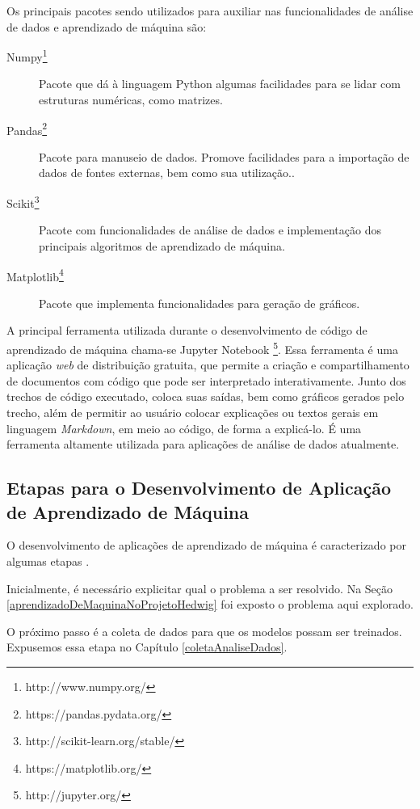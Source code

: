 			Os principais pacotes sendo utilizados para auxiliar nas funcionalidades de análise de dados e aprendizado de máquina são:

			\begin{description}
				\item [Numpy\footnote{http://www.numpy.org/}] Pacote que dá à linguagem Python algumas facilidades para se lidar com estruturas numéricas, como matrizes.
				\item [Pandas\footnote{https://pandas.pydata.org/}] Pacote para manuseio de dados. Promove facilidades para a importação de dados de fontes externas, bem como sua utilização..
				\item [Scikit\footnote{http://scikit-learn.org/stable/}] Pacote com funcionalidades de análise de dados e implementação dos principais algoritmos de aprendizado de máquina.
				\item [Matplotlib\footnote{https://matplotlib.org/}] Pacote que implementa funcionalidades para geração de gráficos.
			\end{description}

			A principal ferramenta utilizada durante o desenvolvimento de código de aprendizado de máquina chama-se Jupyter Notebook \footnote{http://jupyter.org/}. Essa ferramenta é uma aplicação \emph{web} de distribuição gratuita, que permite a criação e compartilhamento de documentos com código que pode ser interpretado interativamente. Junto dos trechos de código executado, coloca suas saídas, bem como gráficos gerados pelo trecho, além de permitir ao usuário colocar explicações ou textos gerais em linguagem \textit{Markdown}, em meio ao código, de forma a explicá-lo. É uma ferramenta altamente utilizada para aplicações de análise de dados atualmente.

		\subsection{Etapas para o Desenvolvimento de Aplicação de Aprendizado de Máquina}

			O desenvolvimento de aplicações de aprendizado de máquina é caracterizado por algumas etapas \cite{whatIsML}.

			Inicialmente, é necessário explicitar qual o problema a ser resolvido. Na Seção \ref{aprendizadoDeMaquinaNoProjetoHedwig} foi exposto o problema aqui explorado.

			O próximo passo é a coleta de dados para que os modelos possam ser treinados. Expusemos essa etapa no Capítulo \ref{coletaAnaliseDados}.

